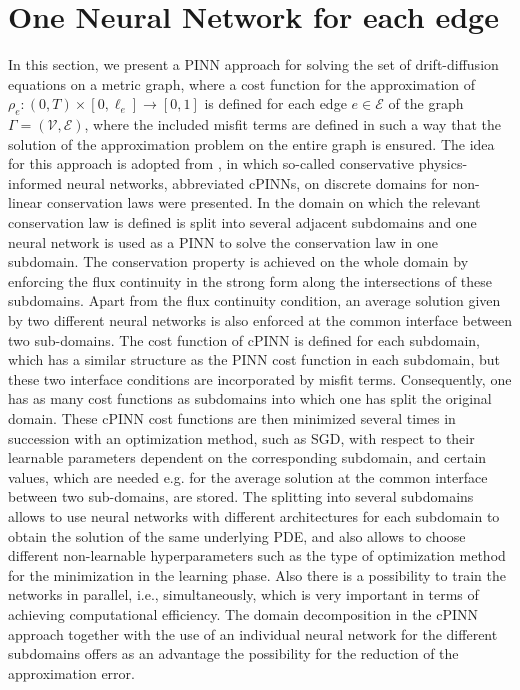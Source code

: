 \section{One Neural Network for each edge}
\label{ch3:sec2}

In this section, we present a PINN approach for solving the set of drift-diffusion equations on a metric graph, where a cost function for the approximation of $\rho_e \colon (0,T) \times [0, \ell_e] \to [0, 1]$ is defined for each edge $e \in \mathcal{E}$ of the graph $\Gamma = (\mathcal{V}, \mathcal{E})$, where the included misfit terms are defined in such a way that the solution of the approximation problem on the entire graph is ensured. The idea for this approach is adopted from \cite{JagtapKharazmiKarniadakis:2020}, in which so-called conservative physics-informed neural networks, abbreviated cPINNs, on discrete domains for non-linear conservation laws were presented. In \cite{JagtapKharazmiKarniadakis:2020} the domain on which the relevant conservation law is defined is split into several adjacent subdomains and one neural network is used as a PINN to solve the conservation law in one subdomain. The conservation property is achieved on the whole domain by enforcing the flux continuity in the strong form along the intersections of these subdomains. Apart from the flux continuity condition, an average solution given by two different neural networks is also enforced at the common interface between two sub-domains. The cost function of cPINN is defined for each subdomain, which has a similar structure as the PINN cost function in each subdomain, but these two interface conditions are incorporated by misfit terms. Consequently, one has as many cost functions as subdomains into which one has split the original domain. These cPINN cost functions are then minimized several times in succession with an optimization method, such as SGD, with respect to their learnable parameters dependent on the corresponding subdomain, and certain values, which are needed e.g. for the average solution at the common interface between two sub-domains, are stored. The splitting into several subdomains allows to use neural networks with different architectures for each subdomain to obtain the solution of the same underlying PDE, and also allows to choose different non-learnable hyperparameters such as the type of optimization method for the minimization in the learning phase. Also there is a possibility to train the networks in parallel, i.e., simultaneously, which is very important in terms of achieving computational efficiency. The domain decomposition in the cPINN approach together with the use of an individual neural network for the different subdomains offers as an advantage the possibility for the reduction of the approximation error. \\
